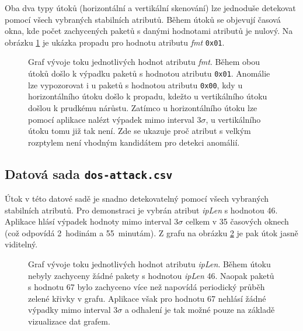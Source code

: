 \bigskip

\noindent Oba dva typy útoků (horizontální a vertikální skenování) lze jednoduše detekovat pomocí všech vybraných stabilních atributů. Během útoků se objevují časová okna, kde počet zachycených paketů s danými hodnotami atributů je nulový. Na obrázku \ref{fig:scanning_fmt} je ukázka propadu pro hodnotu atributu \emph{fmt} \texttt{0x01}.




\begin{figure}[H]
	\centering
	\caption{Graf vývoje toku jednotlivých hodnot atributu \emph{fmt}. Během obou útoků došlo k výpadku paketů s hodnotou atributu \texttt{0x01}. Anomálie lze vypozorovat i u paketů s hodnotou atributu \texttt{0x00}, kdy u horizontálního útoku došlo k propadu, kdežto u vertikálního útoku došlou k prudkému nárůstu. Zatímco u horizontálního útoku lze pomocí aplikace nalézt výpadek mimo interval $3\sigma$, u vertikálního útoku tomu již tak není. Zde se ukazuje proč atribut s velkým rozptylem není vhodným kandidátem pro detekci anomálií. }
	\label{fig:scanning_fmt}
\end{figure}


\newpage

\subsection*{Datová sada \texttt{dos-attack.csv}}

Útok v této datové sadě je snadno detekovatelný pomocí všech vybraných stabilních atributů. Pro demonstraci je vybrán atribut \emph{ipLen} s hodnotou 46. Aplikace hlásí výpadek hodnoty mimo interval $3\sigma$ celkem v 35 časových oknech (což odpovídá 2~hodinám a 55~minutám). Z grafu na obrázku \ref{fig:dos_plot} je pak útok jasně viditelný.

\begin{figure}[H]
	\centering
	\caption{Graf vývoje toku jednotlivých hodnot atributu \emph{ipLen}. Během útoku nebyly zachyceny žádné pakety s hodnotou \emph{ipLen} 46. Naopak paketů s hodnotu 67 bylo zachyceno více než napovídá periodický průběh zelené křivky v grafu. Aplikace však pro hodnotu 67 nehlásí žádné výpadky mimo interval $3\sigma$ a odhalení je tak možné pouze na základě vizualizace dat grafem.}
	\label{fig:dos_plot}
\end{figure}

